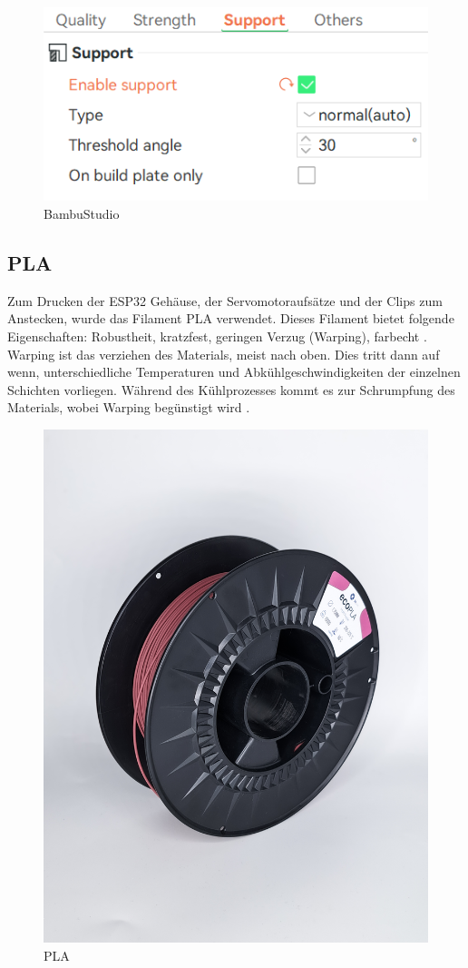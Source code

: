 \begin{figure}[H]
	\centering
	\includegraphics[width=0.5\linewidth]{images/BambuStudio.jpg}
	\caption[BambuStudio]{BambuStudio}
	\label{fig:BambuStudio} 
\end{figure}

\subsection{PLA}
Zum Drucken der ESP32 Gehäuse, der Servomotoraufsätze und der Clips zum Anstecken, wurde das Filament PLA verwendet. Dieses Filament bietet folgende Eigenschaften: Robustheit, kratzfest, geringen Verzug (Warping), farbecht \parencite{PLAEigenschaften}. Warping ist das verziehen des Materials, meist nach oben. Dies tritt dann auf wenn, unterschiedliche Temperaturen und Abkühlgeschwindigkeiten der einzelnen Schichten vorliegen. Während des Kühlprozesses kommt es zur Schrumpfung des Materials, wobei Warping begünstigt wird \parencite{Warping}.

\begin{figure}[H]
	\centering
	\includegraphics[width=0.3\linewidth]{images/PLA.jpg}
	\caption[PLA]{PLA}
	\label{fig:PLA} 
\end{figure}


